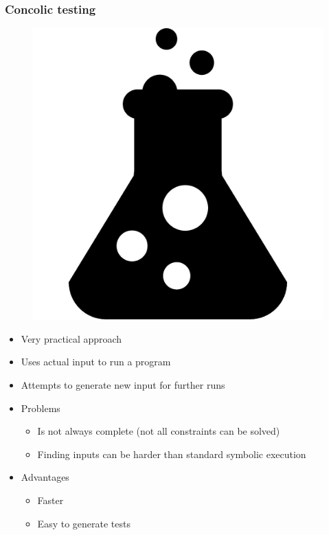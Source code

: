\documentclass{beamer}
\begin{document}
	\begin{frame}
		\frametitle{Concolic testing}
		
		\begin{figure}[htbp]
			\centering
			\includegraphics[scale=0.1]{concolic}
		\end{figure}
		
		\begin{itemize}
			\item Very practical approach
			\item Uses actual input to run a program
			\item Attempts to generate new input for further runs
			\item Problems
			\begin{itemize}
				\item Is not always complete (not all constraints can be solved)
				\item Finding inputs can be harder than standard symbolic execution
			\end{itemize}
			\item Advantages
			\begin{itemize}
				\item Faster
				\item Easy to generate tests
			\end{itemize}
		\end{itemize}
	\end{frame}
	
\end{document}
